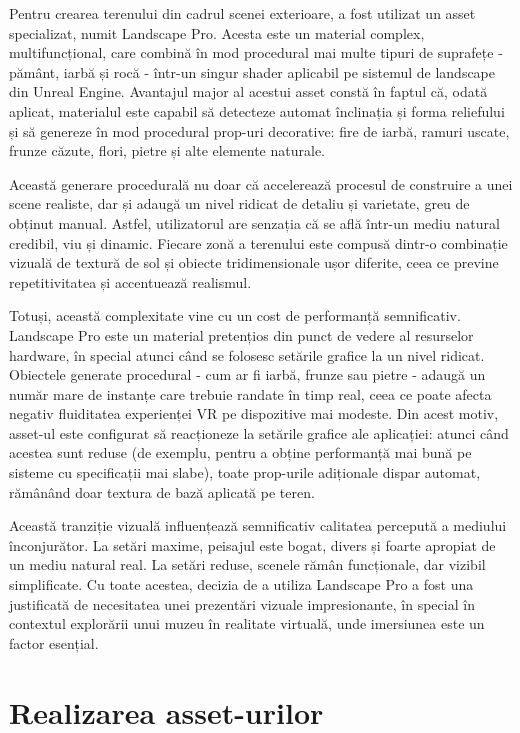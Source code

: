 Pentru crearea terenului din cadrul scenei exterioare, a fost utilizat un asset specializat, numit Landscape Pro. Acesta este un material complex, multifuncțional, care combină în mod procedural mai multe tipuri de suprafețe - pământ, iarbă și rocă - într-un singur shader aplicabil pe sistemul de landscape din Unreal Engine. Avantajul major al acestui asset constă în faptul că, odată aplicat, materialul este capabil să detecteze automat înclinația și forma reliefului și să genereze în mod procedural prop-uri decorative: fire de iarbă, ramuri uscate, frunze căzute, flori, pietre și alte elemente naturale.

Această generare procedurală nu doar că accelerează procesul de construire a unei scene realiste, dar și adaugă un nivel ridicat de detaliu și varietate, greu de obținut manual. Astfel, utilizatorul are senzația că se află într-un mediu natural credibil, viu și dinamic. Fiecare zonă a terenului este compusă dintr-o combinație vizuală de textură de sol și obiecte tridimensionale ușor diferite, ceea ce previne repetitivitatea și accentuează realismul.

Totuși, această complexitate vine cu un cost de performanță semnificativ. Landscape Pro este un material pretențios din punct de vedere al resurselor hardware, în special atunci când se folosesc setările grafice la un nivel ridicat. Obiectele generate procedural - cum ar fi iarbă, frunze sau pietre - adaugă un număr mare de instanțe care trebuie randate în timp real, ceea ce poate afecta negativ fluiditatea experienței VR pe dispozitive mai modeste. Din acest motiv, asset-ul este configurat să reacționeze la setările grafice ale aplicației: atunci când acestea sunt reduse (de exemplu, pentru a obține performanță mai bună pe sisteme cu specificații mai slabe), toate prop-urile adiționale dispar automat, rămânând doar textura de bază aplicată pe teren.

Această tranziție vizuală influențează semnificativ calitatea percepută a mediului înconjurător. La setări maxime, peisajul este bogat, divers și foarte apropiat de un mediu natural real. La setări reduse, scenele rămân funcționale, dar vizibil simplificate. Cu toate acestea, decizia de a utiliza Landscape Pro a fost una justificată de necesitatea unei prezentări vizuale impresionante, în special în contextul explorării unui muzeu în realitate virtuală, unde imersiunea este un factor esențial.

\section{Realizarea asset-urilor}

